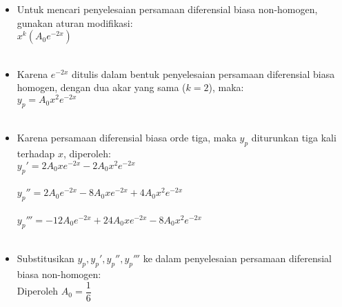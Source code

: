 \begin{enumerate}[1.]
\begin{itemize}
	\item Untuk mencari penyelesaian persamaan diferensial biasa non-homogen, gunakan aturan modifikasi: \\ 
	\begin{math} x^{k} (A_0 e^{-2x}) \end{math} \\ \\
	\item Karena \begin{math} e^{-2x} \end{math} ditulis dalam bentuk penyelesaian persamaan diferensial biasa homogen, dengan dua akar yang sama (\begin{math} k = 2 \end{math}), maka: \\
	\begin{math} y_p = A_0 x^{2} e^{-2x} \end{math} \\ \\
	\item Karena persamaan diferensial biasa orde tiga, maka \begin{math} y_p \end{math} diturunkan tiga kali terhadap \begin{math} x \end{math}, diperoleh: \\
	\begin{math} y_p ' = 2 A_0 x e^{-2x} - 2 A_0 x^{2} e^{-2x} \end{math} \\ \\
	\begin{math} y_p '' = 2 A_0 e^{-2x} - 8 A_0 x e^{-2x} + 4 A_0 x^{2} e^{-2x} \end{math} \\ \\
	\begin{math} y_p ''' = -12 A_0 e^{-2x} + 24 A_0 xe^{-2x} - 8 A_0 x^{2} e^{-2x} \end{math} \\ \\
	\item Substitusikan \begin{math} y_p, y_p ' , y_p '', y_p ''' \end{math} ke dalam penyelesaian persamaan diferensial biasa non-homogen: \\
	Diperoleh \begin{math} A_0 = \dfrac{1}{6} \end{math} \\ 

\end{itemize}
\end{enumerate}
